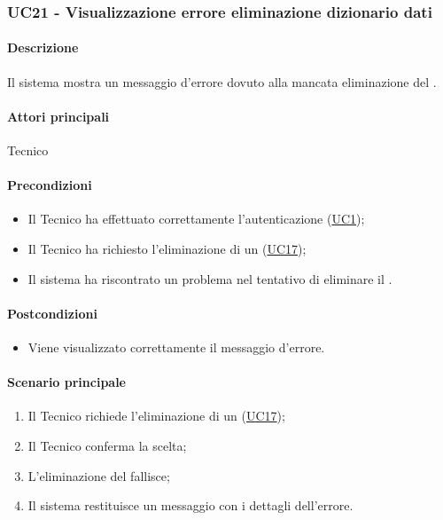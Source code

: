 \subsubsection{UC21 - Visualizzazione errore eliminazione dizionario dati}\label{UC21}
\paragraph*{Descrizione}
Il sistema mostra un messaggio d'errore dovuto alla mancata eliminazione del .

\paragraph*{Attori principali}
Tecnico

\paragraph*{Precondizioni}
\begin{itemize}
  \item Il Tecnico ha effettuato correttamente l'autenticazione (\hyperref[UC1]{UC1});
  \item Il Tecnico ha richiesto l'eliminazione di un  (\hyperref[UC17]{UC17});
  \item Il sistema ha riscontrato un problema nel tentativo di eliminare il .
\end{itemize}

\paragraph*{Postcondizioni}
\begin{itemize}
  \item Viene visualizzato correttamente il messaggio d'errore.
\end{itemize}

\paragraph*{Scenario principale}
\begin{enumerate}
  \item Il Tecnico richiede l'eliminazione di un  (\hyperref[UC17]{UC17});
  \item Il Tecnico conferma la scelta;
  \item L'eliminazione del  fallisce;
  \item Il sistema restituisce un messaggio con i dettagli dell'errore.
\end{enumerate}